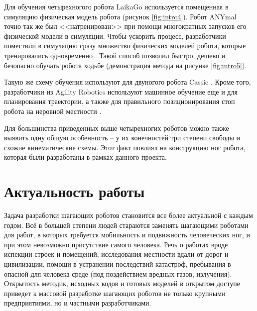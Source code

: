 Для обучения четырехногого робота LaikaGo используется помещенная в симуляцию физическая модель робота \cite{LaikaGo2019} (рисунок \ref{fig:intro4}). Робот ANYmal точно так же был <<натренирован>> при помощи многократных запусков его физической модели в симуляции. Чтобы ускорить процесс, разработчики поместили в симуляцию сразу множество физических моделей робота, которые тренировались одновременно \cite{RoboSysLab2019}. Такой способ позволил быстро, дешево и безопасно обучать робота ходьбе (демонстрация метода на рисунке \ref{fig:intro5}). 

Такую же схему обучения используют для двуногого робота Cassie \cite{AgilityRobo2018}. Кроме того, разработчики из Agility Robotics используют машинное обучение еще и для планирования траектории, а также для правильного позиционирования стоп робота на неровной местности \cite{Agility2020}.

Для большинства приведенных выше четырехногих роботов можно также выявить одну общую особенность -- у их конечностей три степени свободы и схожие кинематические схемы. Этот факт повлиял на конструкцию ног робота, которая были разработаны в рамках данного проекта.

\section*{Актуальность работы}

Задача разработки шагающих роботов становится все более актуальной с каждым годом. Всё в большей степени людей стараются заменять шагающими роботами для работ, в которых требуется мобильность и подвижность человеческих ног, и при этом невозможно присутствие самого человека. Речь о работах вроде испекции строек и помещений, исследования местности вдали от дорог и цивилизации, помощи в устранении последствий катастроф, пребывания в опасной для человека среде (под поздействием вредных газов, излучения). Открытость методик, исходных кодов и готовых моделей в открытом доступе приведет к массовой разработке шагающих роботов не только крупными предприятиями, но и частными разработчиками.

